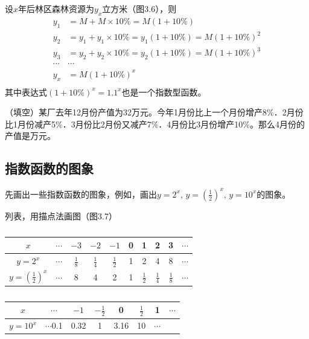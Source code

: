  
 
 \begin{solution}
 设$x$年后林区森林资源为$y_x$立方米（图3.6），则
 \[\begin{split}
     y_1&=M+M\times 10\%=M(1+10\%)\\
     y_2&=y_1+y_1\times 10\%=y_1(1+10\%)=M(1+10\%)^2\\
     y_3&=y_2+y_2\times 10\%=y_2(1+10\%)=M(1+10\%)^3\\
 \cdots&\cdots\\
     y_x&=M(1+10\%)^x\\
 \end{split}\]
 其中表达式$(1+10\%)^x=1.1^x$也是一个指数型函数。
 \end{solution}
 
 
 \begin{ex}
     （填空）某厂去年12月份产值为32万元。今年1月份比上一个月份增产8\%．2月份比1月份减产5\%．3月份比2月份又减产7\%．4月份比3月份增产10\%。那么4月份的产值是\blank 万元。
 \end{ex}
 
 \subsection{指数函数的图象}
 
 先画出一些指数函数的图象，例如，画出$y=2^x$, 
 $y=\left(\frac{1}{2}\right)^x$, $y=10^x$的图象。
 
 列表，用描点法画图（图3.7）
 \begin{table}[htp]
     \centering
     \caption{}    
 \begin{tabular}{c|ccccccccc}
 \hline
         $x$ & $\cdots $&$-3$&$-2$&$-1$&0&1&2&3&$\cdots$\\
 \hline
 $y=2^x$ & $\cdots$&$\frac{1}{8}$ &$\frac{1}{4}$& $\frac{1}{2}$& 1&2&4&8&$\cdots$\\
 $y=\left(\frac{1}{2}\right)^x$ &$\cdots$&8&4&2&1&$\frac{1}{2}$&$\frac{1}{4}$&$\frac{1}{8}$&$\cdots$\\
 \hline
     \end{tabular}
 
 \begin{tabular}{c|ccccccc}
 \hline
 $x$&$\cdots$&$-1$&$-\frac{1}{2}$&0&$\frac{1}{2}$&1&$\cdots$\\
 \hline
 $y=10^x$&$\cdots$0.1&0.32&1&3.16&10&$\cdots$\\
 \hline
 \end{tabular}
 \end{table}
 
